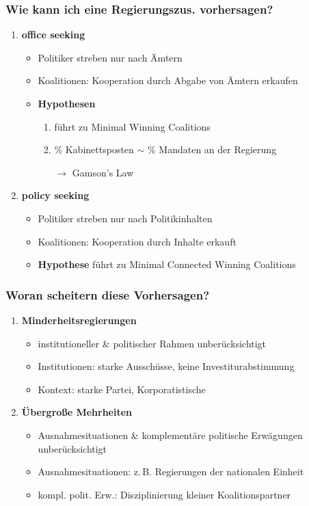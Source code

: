 \documentclass{beamer}
\begin{document}
\begin{frame}
  \frametitle{Wie kann ich eine Regierungszus. vorhersagen?}
  \begin{enumerate}
    \item \textbf{office seeking}
    \begin{itemize}
      \item Politiker streben nur nach Ämtern
      \item Koalitionen: Kooperation durch Abgabe von Ämtern erkaufen
      \item \textbf{Hypothesen}
      \begin{enumerate}
        \item führt zu Minimal Winning Coalitions
        \item $\%$ Kabinettsposten $\sim$ $\%$ Mandaten an der Regierung
        \item [$\rightarrow$] Gamson's Law
      \end{enumerate}
    \end{itemize}
    \item \textbf{policy seeking}
    \begin{itemize}
      \item Politiker streben nur nach Politikinhalten
      \item Koalitionen: Kooperation durch Inhalte erkauft
      \item \textbf{Hypothese} führt zu Minimal Connected Winning Coalitions
    \end{itemize}
  \end{enumerate}
\end{frame}

\begin{frame}
  \frametitle{Woran scheitern diese Vorhersagen?}
  \begin{enumerate}
    \item \textbf{Minderheitsregierungen}
    \begin{itemize}
      \item institutioneller \& politischer Rahmen unberücksichtigt
      \item Institutionen: starke Ausschüsse, keine Investiturabstimmung
      \item Kontext: starke Partei, Korporatistische
    \end{itemize}
    \item \textbf{Übergroße Mehrheiten}
    \begin{itemize}
      \item Ausnahmesituationen \& komplementäre politische Erwägungen unberücksichtigt
      \item Ausnahmesituationen: z.\,B. Regierungen der nationalen Einheit
      \item kompl. polit. Erw.: Disziplinierung kleiner Koalitionspartner
    \end{itemize}
  \end{enumerate}
\end{frame}
\end{document}
